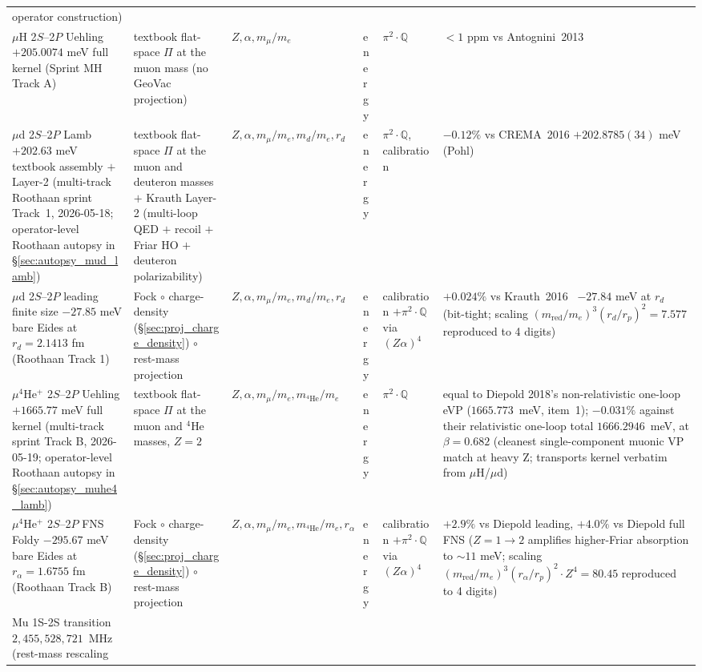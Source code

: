 \documentclass[11pt]{article}
\begin{document}
\begin{longtable}{p{3.5cm} p{2.8cm} p{1.3cm} p{2.2cm} p{1.8cm} p{1.4cm}}
operator construction) \\
$\mu$H 2$S$--2$P$ Uehling $+205.0074$ meV full kernel
(Sprint MH Track A) & textbook flat-space $\Pi$ at the muon mass (no GeoVac
projection) & $Z, \alpha, m_\mu/m_e$ & energy &
$\pi^2{\cdot}\mathbb{Q}$ & $<1$ ppm vs Antognini~2013 \\
$\mu$d 2$S$--2$P$ Lamb $+202.63$ meV textbook assembly $+$ Layer-2
(multi-track Roothaan sprint Track~1, 2026-05-18; operator-level
Roothaan autopsy in \S\ref{sec:autopsy_mud_lamb}) & textbook flat-space
$\Pi$ at the muon and deuteron masses $+$ Krauth Layer-2 (multi-loop QED $+$ recoil $+$
Friar HO $+$ deuteron polarizability) & $Z, \alpha, m_\mu/m_e,
m_d/m_e, r_d$ & energy & $\pi^2{\cdot}\mathbb{Q}$, calibration &
$-0.12\%$ vs CREMA~2016 $+202.8785(34)$ meV (Pohl) \\
$\mu$d 2$S$--2$P$ leading finite size $-27.85$ meV bare Eides at $r_d
= 2.1413$ fm (Roothaan Track 1) & Fock $\circ$ charge-density
(\S\ref{sec:proj_charge_density}) $\circ$ rest-mass projection &
$Z, \alpha, m_\mu/m_e, m_d/m_e, r_d$ & energy & calibration $+
\pi^2{\cdot}\mathbb{Q}$ via $(Z\alpha)^4$ & $+0.024\%$ vs Krauth~2016~\cite{krauth2016}
$-27.84$ meV at $r_d$ (bit-tight; scaling
$(m_\text{red}/m_e)^3 (r_d/r_p)^2 = 7.577$ reproduced to 4 digits) \\
$\mu^4$He$^+$ 2$S$--2$P$ Uehling $+1665.77$ meV full kernel
(multi-track sprint Track B, 2026-05-19; operator-level Roothaan
autopsy in \S\ref{sec:autopsy_muhe4_lamb}) & textbook flat-space $\Pi$ at
the muon and $^4$He masses, $Z=2$ & $Z, \alpha, m_\mu/m_e,
m_{^4\text{He}}/m_e$ & energy & $\pi^2{\cdot}\mathbb{Q}$ &
equal to Diepold 2018's non-relativistic one-loop eVP ($1665.773$~meV,
item~1); $-0.031\%$ against their relativistic one-loop total
$1666.2946$~meV, at $\beta = 0.682$ (cleanest
single-component muonic VP match at heavy Z; transports kernel
verbatim from $\mu$H/$\mu$d) \\
$\mu^4$He$^+$ 2$S$--2$P$ FNS Foldy $-295.67$ meV bare Eides at $r_\alpha
= 1.6755$ fm (Roothaan Track B) & Fock $\circ$ charge-density
(\S\ref{sec:proj_charge_density}) $\circ$ rest-mass projection &
$Z, \alpha, m_\mu/m_e, m_{^4\text{He}}/m_e, r_\alpha$ & energy &
calibration $+ \pi^2{\cdot}\mathbb{Q}$ via $(Z\alpha)^4$ &
$+2.9\%$ vs Diepold leading, $+4.0\%$ vs Diepold full FNS
($Z = 1 \to 2$ amplifies higher-Friar absorption to $\sim 11$ meV;
scaling $(m_\text{red}/m_e)^3 (r_\alpha/r_p)^2 \cdot Z^4 = 80.45$
reproduced to 4 digits) \\
Mu 1S-2S transition $2{,}455{,}528{,}721$~MHz (rest-mass rescaling

\end{longtable}
\end{document}
